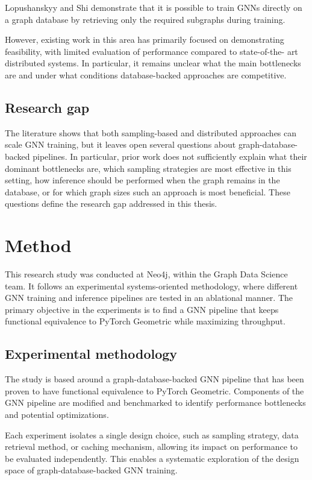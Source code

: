 \documentclass[PhD,single]{uclathes}
\begin{document}
Lopushanskyy and Shi demonstrate that it is possible to train GNNs directly on a
graph database by retrieving only the required subgraphs during training.

However, existing work in this area has primarily focused on demonstrating
feasibility, with limited evaluation of performance compared to state-of-the-
art distributed systems. In particular, it remains unclear what the main
bottlenecks are and under what conditions database-backed approaches are
competitive.

\section{Research gap}
The literature shows that both sampling-based and distributed approaches can
scale GNN training, but it leaves open several questions about graph-database-
backed pipelines. In particular, prior work does not sufficiently explain what
their dominant bottlenecks are, which sampling strategies are most effective in
this setting, how inference should be performed when the graph remains in the
database, or for which graph sizes such an approach is most beneficial. These
questions define the research gap addressed in this thesis.

\chapter{Method}

This research study was conducted at Neo4j, within the Graph Data Science team.
It follows an experimental systems-oriented methodology, where different GNN
training and inference pipelines are tested in an ablational manner. The
primary objective in the experiments is to find a GNN pipeline that keeps
functional equivalence to PyTorch Geometric while maximizing throughput.

\section{Experimental methodology}
The study is based around a graph-database-backed GNN pipeline that has been
proven to have functional equivalence to PyTorch Geometric. Components of the
GNN pipeline are modified and benchmarked to identify performance bottlenecks
and potential optimizations.

Each experiment isolates a single design choice, such as sampling strategy,
data retrieval method, or caching mechanism, allowing its impact on performance
to be evaluated independently. This enables a systematic exploration of the
design space of graph-database-backed GNN training.
\end{document}
